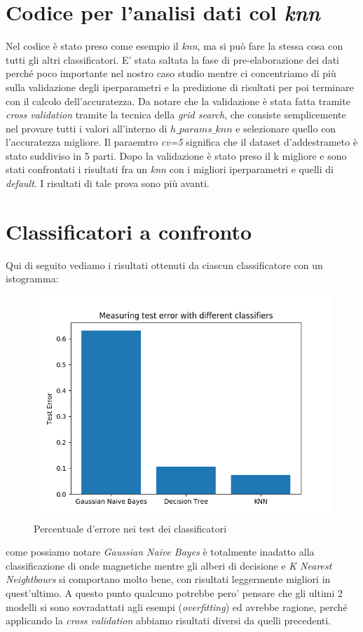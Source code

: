 \section{Codice per l'analisi dati col \textit{knn}}

Nel codice \`e stato preso come esempio il \textit{knn}, ma si pu\`o fare la stessa cosa con tutti gli altri classificatori. E' stata saltata la fase di pre-elaborazione dei dati perch\'e poco importante nel nostro caso studio mentre ci concentriamo di pi\`u  sulla validazione degli iperparametri e la predizione di risultati per poi terminare con il calcolo dell'accuratezza. Da notare che la validazione \`e stata fatta tramite \textit{cross validation} tramite la tecnica della \textit{grid search}, che consiste semplicemente nel provare tutti i valori all'interno di \textit{$h\_params\_knn$} e selezionare quello con l'accuratezza migliore. Il paraemtro \textit{cv=5} significa che il dataset d'addestrameto \`e stato suddiviso in 5 parti. Dopo la validazione \`e stato preso il k migliore e sono stati confrontati i risultati fra un \textit{knn} con i migliori iperparametri e quelli di \textit{default}. I risultati di tale prova sono pi\`u  avanti.


\section{Classificatori a confronto}
Qui di seguito vediamo i risultati ottenuti da ciascun classificatore con un istogramma:

\begin{figure}[H]
	\centering
	\includegraphics[width=0.7\linewidth]{img/test_errors}
	\caption{Percentuale d'errore nei test dei classificatori}
	\label{fig:testerrors}
\end{figure}

come possiamo notare \textit{Gaussian Naive Bayes} \`e totalmente inadatto alla classificazione di onde magnetiche mentre gli alberi di decisione e \textit{K Nearest Neightbours} si comportano molto bene, con risultati leggermente migliori in quest'ultimo.
A questo punto qualcuno potrebbe pero' pensare che gli ultimi 2 modelli si sono sovradattati agli esempi (\textit{overfitting}) ed avrebbe ragione, perch\'e applicando la \textit{cross validation} abbiamo risultati diversi da quelli precedenti.

